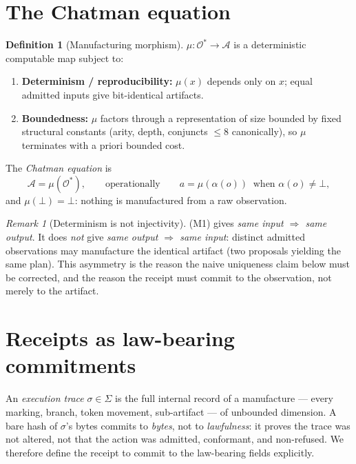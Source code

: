 \documentclass[11pt,oneside]{book}
\theoremstyle{definition}
\newtheorem{definition}{Definition}[chapter]
\theoremstyle{plain}
\theoremstyle{remark}
\newtheorem*{remark}{Remark}
\newcommand{\Adm}{\mathcal{O}^{*}}             %
\newcommand{\Act}{\mathcal{A}}                 %
\newcommand{\muop}{\mu}                        %
\newcommand{\adm}{\alpha}                      %
\newcommand{\Rfsl}{\bot}                       %
\begin{document}
\section{The Chatman equation}

\begin{definition}[Manufacturing morphism]\label{def:mu}
$\muop:\Adm\to\Act$ is a deterministic computable map subject to:
\begin{enumerate}[label=(M\arabic*),leftmargin=*]
\item \textbf{Determinism / reproducibility:} $\muop(x)$ depends only on $x$; equal admitted
inputs give bit-identical artifacts.
\item \textbf{Boundedness:} $\muop$ factors through a representation of size bounded by fixed
structural constants (arity, depth, conjuncts $\le 8$ canonically), so $\muop$ terminates
with a priori bounded cost.
\end{enumerate}
The \emph{Chatman equation} is
\begin{equation}\label{eq:chatman}
\Act=\muop(\Adm), \qquad\text{operationally}\qquad a=\muop(\adm(o))\ \text{ when }\adm(o)\ne\Rfsl,
\end{equation}
and $\muop(\Rfsl)=\Rfsl$: nothing is manufactured from a raw observation.
\end{definition}

\begin{remark}[Determinism is not injectivity]
(M1) gives \emph{same input $\Rightarrow$ same output}. It does \emph{not} give
\emph{same output $\Rightarrow$ same input}: distinct admitted observations may manufacture
the identical artifact (two proposals yielding the same plan). This asymmetry is the reason
the naive uniqueness claim below must be corrected, and the reason the receipt must commit
to the observation, not merely to the artifact.
\end{remark}

\section{Receipts as law-bearing commitments}

An \emph{execution trace} $\sigma\in\Sigma$ is the full internal record of a manufacture ---
every marking, branch, token movement, sub-artifact --- of unbounded dimension. A bare hash
of $\sigma$'s bytes commits to \emph{bytes}, not to \emph{lawfulness}: it proves the trace
was not altered, not that the action was admitted, conformant, and non-refused. We therefore
define the receipt to commit to the law-bearing fields explicitly.
\end{document}
